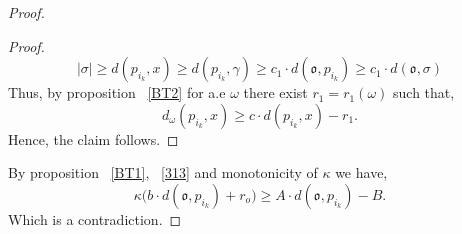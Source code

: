 \documentclass[12 pt]{amsart}
\newtheorem{lemma}[theorem]{Lemma}
\theoremstyle{definition}
\newtheorem{definition}[theorem]{Definition}
\theoremstyle{remark}
\newcommand{\pka}{\partial_{\kappa}}
\newcommand{\from}{\colon\thinspace}
\begin{document}
\begin{proof}
\begin{proof}
    \[|\sigma|\geq d(p_{i_k},x)\geq d(p_{i_k},\gamma)\geq c_1 \cdot d(\mathfrak{o},p_{i_k}) \geq c_1 \cdot d(\mathfrak{o}, \sigma)\]
    Thus, by proposition ~\ref{BT2} for a.e $\omega$ there exist $r_1=r_1(\omega)$ such that, \[ d_\omega(p_{i_k},x)\geq c \cdot d(p_{i_k},x)-r_1.\] Hence, the claim follows.
    \end{proof}
    By proposition ~\ref{BT1}, ~\ref{313} and monotonicity of $\kappa$ we have, \[\kappa\big(b \cdot d(\mathfrak{o},p_{i_k})+r_o\big) \geq A \cdot d(\mathfrak{o},p_{i_k})-B.\]
    Which is a contradiction.
    \end{proof}
    
    

\end{document}
